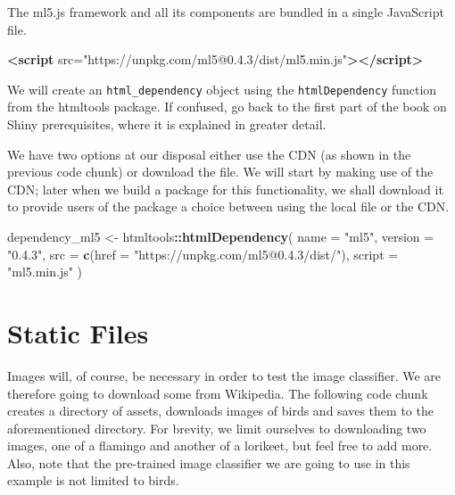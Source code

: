 \documentclass[10pt,]{krantz}
\makeatletter
\newenvironment{Shaded}{\begin{snugshade}}{\end{snugshade}}
\newcommand{\DataTypeTok}[1]{\textcolor[rgb]{0.27,0.27,0.27}{#1}}
\newcommand{\KeywordTok}[1]{\textcolor[rgb]{0.27,0.27,0.27}{\textbf{#1}}}
\newcommand{\NormalTok}[1]{#1}
\newcommand{\OperatorTok}[1]{\textcolor[rgb]{0.43,0.43,0.43}{\textbf{#1}}}
\newcommand{\OtherTok}[1]{\textcolor[rgb]{0.37,0.37,0.37}{#1}}
\newcommand{\StringTok}[1]{\textcolor[rgb]{0.5,0.5,0.5}{#1}}
\newenvironment{kframe}{%
\medskip{}
\setlength{\fboxsep}{.8em}
 \def\at@end@of@kframe{}%
 \ifinner\ifhmode%
  \def\at@end@of@kframe{\end{minipage}}%
  \begin{minipage}{\columnwidth}%
 \fi\fi%
 \def\FrameCommand##1{\hskip\@totalleftmargin \hskip-\fboxsep
 \colorbox{shadecolor}{##1}\hskip-\fboxsep
     \hskip-\linewidth \hskip-\@totalleftmargin \hskip\columnwidth}%
 \MakeFramed {\advance\hsize-\width
   \@totalleftmargin\z@ \linewidth\hsize
   \@setminipage}}%
 {\par\unskip\endMakeFramed%
 \at@end@of@kframe}
\renewenvironment{Shaded}{\begin{kframe}}{\end{kframe}}
\makeatother
\begin{document}
The ml5.js framework and all its components are bundled in a single JavaScript file.

\begin{Shaded}
\begin{Highlighting}[]
\KeywordTok{<script}\OtherTok{ src=}\StringTok{"https://unpkg.com/ml5@0.4.3/dist/ml5.min.js"}\KeywordTok{></script>}
\end{Highlighting}
\end{Shaded}

We will create an \texttt{html\_dependency} object using the \texttt{htmlDependency} function from the htmltools package. If confused, go back to the first part of the book on Shiny prerequisites, where it is explained in greater detail.

We have two options at our disposal either use the CDN (as shown in the previous code chunk) or download the file. We will start by making use of the CDN; later when we build a package for this functionality, we shall download it to provide users of the package a choice between using the local file or the CDN.

\begin{Shaded}
\begin{Highlighting}[]
\NormalTok{dependency_ml5 <-}\StringTok{ }\NormalTok{htmltools}\OperatorTok{::}\KeywordTok{htmlDependency}\NormalTok{(}
  \DataTypeTok{name =} \StringTok{"ml5"}\NormalTok{,}
  \DataTypeTok{version =} \StringTok{"0.4.3"}\NormalTok{,}
  \DataTypeTok{src =} \KeywordTok{c}\NormalTok{(}\DataTypeTok{href =} \StringTok{"https://unpkg.com/ml5@0.4.3/dist/"}\NormalTok{),}
  \DataTypeTok{script =} \StringTok{"ml5.min.js"}
\NormalTok{)}
\end{Highlighting}
\end{Shaded}

\hypertarget{shiny-complete-images}{%
\section{Static Files}\label{shiny-complete-images}}

Images will, of course, be necessary in order to test the image classifier. We are therefore going to download some from Wikipedia. The following code chunk creates a directory of assets, downloads images of birds and saves them to the aforementioned directory. For brevity, we limit ourselves to downloading two images, one of a flamingo and another of a lorikeet, but feel free to add more. Also, note that the pre-trained image classifier we are going to use in this example is not limited to birds.
\end{document}
